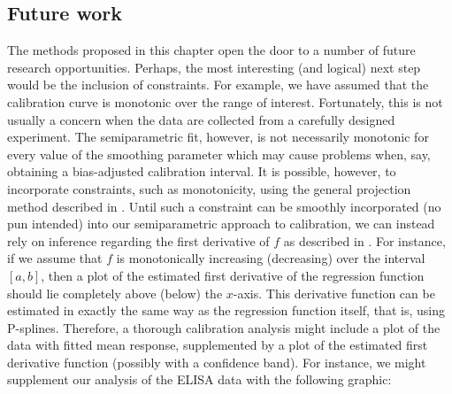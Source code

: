 \documentclass[cmfont,usenames,dvipsnames,leqno]{afit-etd}\usepackage[]{graphicx}\usepackage[]{color}
\begin{document}
\subsection{Future work}
The methods proposed in this chapter open the door to a number of future research opportunities. Perhaps, the most interesting (and logical) next step would be the inclusion of constraints. For example, we have assumed that the calibration curve is monotonic over the range of interest. Fortunately, this is not usually a concern when the data are collected from a carefully designed experiment. The semiparametric fit, however, is not necessarily monotonic for every value of the smoothing parameter which may cause problems when, say, obtaining a bias-adjusted calibration interval. It is possible, however, to incorporate constraints, such as monotonicity, using the general projection method described in \citet{mammen_general_2001}. Until such a constraint can be smoothly incorporated (no pun intended) into our semiparametric approach to calibration, we can instead rely on inference regarding the first derivative of $f$ as described in \citet[pp. 151-156]{ruppert_semiparametric_2003}. For instance, if we assume that $f$ is monotonically increasing (decreasing) over the interval $[a, b]$, then a plot of the estimated first derivative of the regression function should lie completely above (below) the $x$-axis. This derivative function can be estimated in exactly the same way as the regression function itself, that is, using \ac{P-spline}s. Therefore, a thorough calibration analysis might include a plot of the data with fitted mean response, supplemented by a plot of the estimated first derivative function (possibly with a confidence band). For instance, we might supplement our analysis of the ELISA data with the following graphic:
\end{document}

